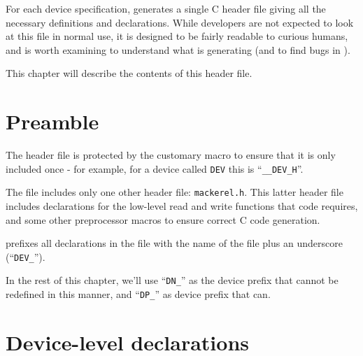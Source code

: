 \documentclass[a4paper,11pt,twoside]{report}
\begin{document}
For each device specification, \Mac generates a single C header file
giving all the necessary definitions and declarations.   While
developers are not expected to look at this file in normal use, it is
designed to be fairly readable to curious humans, and is worth
examining to understand what \Mac is generating (and to find bugs in
\Mac). 

This chapter will describe the contents of this header file. 

\section{Preamble}

The header file is protected by the customary macro to ensure that it
is only included once - for example, for a device called \texttt{DEV} this is
``\texttt{\_\_DEV\_H}''. 

The file includes only one other header file: \texttt{mackerel.h}.
This latter header file includes declarations for the low-level read
and write functions that \Mac code requires, and some other
preprocessor macros to ensure correct C code generation.   

\Mac prefixes all declarations in the file with the
name of the file plus an underscore (``\texttt{DEV\_}''). 







In the rest of this chapter, we'll use ``\texttt{DN\_}'' as the
device prefix that cannot be redefined in this manner, and ``\texttt{DP\_}''
as device prefix that can. 

\section{Device-level declarations}
\end{document}

